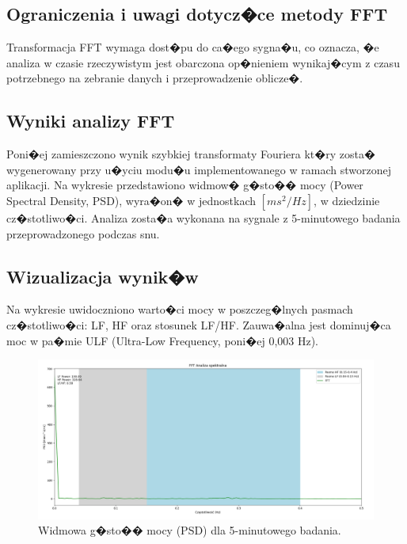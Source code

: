 \subsection{Ograniczenia i uwagi dotycz�ce metody FFT}
Transformacja FFT wymaga dost�pu do ca�ego sygna�u, co oznacza, �e analiza w
czasie rzeczywistym jest obarczona op�nieniem wynikaj�cym z czasu potrzebnego
na zebranie danych i przeprowadzenie oblicze�.

\subsection{Wyniki analizy FFT}
Poni�ej zamieszczono wynik szybkiej transformaty Fouriera kt�ry zosta�
wygenerowany przy u�yciu modu�u implementowanego w ramach stworzonej aplikacji.
Na wykresie przedstawiono widmow� g�sto�� mocy (Power Spectral Density, PSD),
wyra�on� w jednostkach \([ms^2/Hz]\), w dziedzinie cz�stotliwo�ci. Analiza
zosta�a wykonana na sygnale z 5-minutowego badania przeprowadzonego podczas
snu.

\subsection{Wizualizacja wynik�w}
Na wykresie uwidoczniono warto�ci mocy w poszczeg�lnych pasmach cz�stotliwo�ci:
LF, HF oraz stosunek LF/HF. Zauwa�alna jest dominuj�ca moc w pa�mie ULF
(Ultra-Low Frequency, poni�ej 0,003 Hz).
\begin{figure}
    \centering
    \includegraphics[scale=0.25]{Rysunki/fftFAR.png}
    \caption{Widmowa g�sto�� mocy (PSD) dla 5-minutowego badania.}
    \label{fig:fft_psd}
\end{figure}


